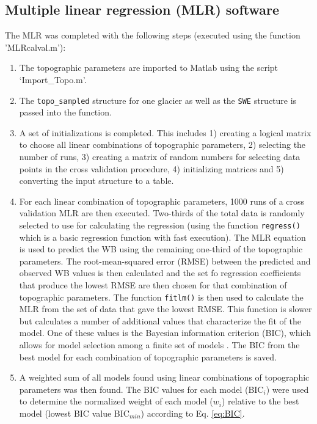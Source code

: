 \documentclass{sfuthesis}
\begin{document}
\begin{appendices}
	\chapter{Multiple linear regression (MLR) software}
\label{sec:MLRMethods}

The MLR was completed with the following steps (executed using the function 'MLRcalval.m'):
\begin{enumerate}
\item The topographic parameters are imported to Matlab using the script `Import\_Topo.m'.

\item The \texttt{topo\_sampled} structure for one glacier as well as the \texttt{SWE} structure is passed into the function.

\item A set of initializations is completed. This includes 1) creating a logical matrix to choose all linear combinations of topographic parameters, 2) selecting the number of runs, 3) creating a matrix of random numbers for selecting data points in the cross validation procedure, 4) initializing matrices and 5) converting the input structure to a table.

\item For each linear combination of topographic parameters, 1000 runs of a cross validation MLR are then executed. Two-thirds of the total data is randomly selected \citep{Kohavi1995} to use for calculating the regression (using the function \texttt{regress()} which is a basic regression function with fast execution). The MLR equation is used to predict the WB using the remaining one-third of the topographic parameters. The root-mean-squared error (RMSE) between the predicted and observed WB values is then calculated and the set fo regression coefficients that produce the lowest RMSE are then chosen for that combination of topographic parameters. The function \texttt{fitlm()} is then used to calculate the MLR from the set of data that gave the lowest RMSE. This function is slower but calculates a number of additional values that characterize the fit of the model. One of these values is the Bayesian information criterion (BIC), which allows for model selection among a finite set of models \citep{Burnham2004}. The BIC from the best model for each combination of topographic parameters is saved.

\item A weighted sum of all models found using linear combinations of topographic parameters was then found. The BIC values for each model (BIC$_i$) were used to determine the normalized weight of each model ($w_i$) relative to the best model (lowest BIC value BIC$_{min}$) according to Eq. \ref{eq:BIC}.


\end{enumerate}
\end{appendices}
\end{document}
